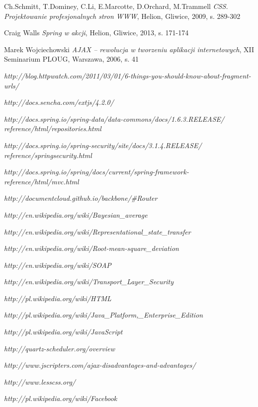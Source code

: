 \begin{thebibliography}{99}
	
	Ch.Schmitt, T.Dominey, C.Li, E.Marcotte, D.Orchard, M.Trammell
	\emph{CSS. Projektowanie profesjonalnych stron WWW},
	Helion,
	Gliwice, 2009,
	s. 289-302	
	
	Craig Walls
	\emph{Spring w akcji},
	Helion,
	Gliwice, 2013,
	s. 171-174
	
	Marek Wojciechowski
	\emph{AJAX – rewolucja w tworzeniu aplikacji internetowych},
	XII Seminarium PLOUG,
	Warszawa, 2006,
	s. 41

	\emph{http://blog.httpwatch.com/2011/03/01/6-things-you-should-know-about-fragment-urls/}

	\emph{http://docs.sencha.com/extjs/4.2.0/}	
	
	\emph{http://docs.spring.io/spring-data/data-commons/docs/1.6.3.RELEASE/\\reference/html/repositories.html}
	
	\emph{http://docs.spring.io/spring-security/site/docs/3.1.4.RELEASE/\\reference/springsecurity.html}

	\emph{http://docs.spring.io/spring/docs/current/spring-framework-reference/html/mvc.html}
	
	\emph{http://documentcloud.github.io/backbone/\#Router}

	\emph{http://en.wikipedia.org/wiki/Bayesian\_average}
	
	\emph{http://en.wikipedia.org/wiki/Representational\_state\_transfer}	
		
	\emph{http://en.wikipedia.org/wiki/Root-mean-square\_deviation}
	
	\emph{http://en.wikipedia.org/wiki/SOAP}
	
	\emph{http://en.wikipedia.org/wiki/Transport\_Layer\_Security}

	\emph{http://pl.wikipedia.org/wiki/HTML}		
	
	\emph{http://pl.wikipedia.org/wiki/Java\_Platform,\_Enterprise\_Edition}
	
	\emph{http://pl.wikipedia.org/wiki/JavaScript}			
	
	\emph{http://quartz-scheduler.org/overview}

	\emph{http://www.jscripters.com/ajax-disadvantages-and-advantages/}
	
	\emph{http://www.lesscss.org/}
	
	\emph{http://pl.wikipedia.org/wiki/Facebook}	

\end{thebibliography}
